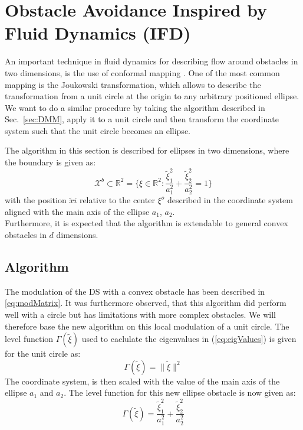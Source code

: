 \section{Obstacle Avoidance Inspired by Fluid Dynamics (IFD)} \label{sec:IFD}
An important technique in fluid dynamics for describing flow around obstacles in two dimensions, is the use of conformal mapping \cite{milne1996theoretical,feder1997real}. One of the most common mapping is the Joukowski transformation, which allows to describe the transformation from a unit circle at the origin to any arbitrary positioned ellipse. We want to do a similar procedure by taking the algorithm described in Sec.~\ref{sec:DMM}, apply it to a unit circle and then transform the coordinate system such that the unit circle becomes an ellipse.

The algorithm in this section is described for ellipses in two dimensions, where the boundary is given as:
\begin{equation}
\mathcal{X}^b \subset \mathbb{R}^2 = \{ \xi \in \mathbb{R}^2 : \frac{\tilde \xi_1^2}{a_1^2} + \frac{\tilde \xi_2^2}{a_2^2} = 1 \} \label{eq:ellipse_2d}
\end{equation}
with the position $\tilde xi$ relative to the center $\xi^o$ described in the coordinate system aligned with the main axis of the ellipse $a_1$, $a_2$.\\
Furthermore, it is expected that the algorithm is  extendable to general convex obstacles in $d$ dimensions. %

\subsection{Algorithm}
The modulation of the DS with a convex obstacle has been described in \ref{eq:modMatrix}. It was furthermore observed, that this algorithm did perform well with a circle but has limitations with more complex obstacles. We will therefore base the new algorithm on this local modulation of a unit circle. The level function $\Gamma(\tilde \xi)$ used to caclulate the eigenvalues in (\ref{eq:eigValues}) is given for the unit circle as:
\begin{equation}
\Gamma(\tilde \xi) = \| \tilde \xi \|^2 \label{eq:levelCircle}
\end{equation}
The coordinate system, is then scaled with the value of the main axis of the ellipse $a_1$ and $a_2$. The level function for this new ellipse obstacle is now given as:
\begin{equation}
\Gamma(\tilde \xi) = \frac{\tilde \xi_1^2}{a_1^2} +  \frac{\tilde \xi_2^2}{a_2^2} \label{eq:levelEllipse}
\end{equation}

